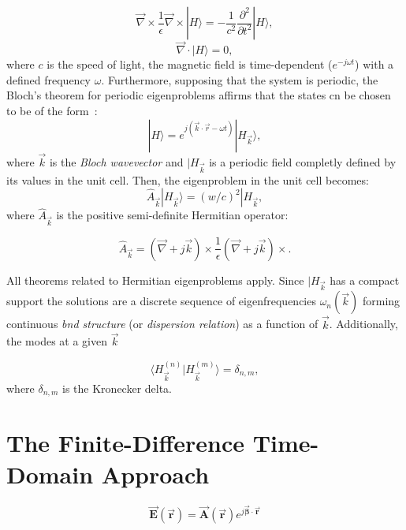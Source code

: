 \documentclass[journal,transmag]{IEEEtran}
\begin{document}
\begin{equation}
	\vec{\nabla} \times \frac{1}{\epsilon}\vec{\nabla}\times | H \rangle =
	-\frac{1}{c^{2}}\frac{\partial^{2}}{\partial t^{2}} |H \rangle,
\end{equation}
\begin{equation}
	\vec{\nabla}\cdot |H \rangle = 0,
\end{equation}
where $c$ is the speed of light, the magnetic field is time-dependent ($e^{-j\omega t}$)
with a defined frequency $\omega$.
Furthermore, supposing that the system is periodic, the Bloch's theorem
for periodic eigenproblems affirms that the states cn be chosen to be of the form~\cite{ashcroft_solid_1976}:
\begin{equation}
	|H \rangle = e^{j(\vec{k} \cdot \vec{r}-\omega t)} |H_{\vec{k}} \rangle,
\end{equation}
where $\vec{k}$ is the \textit{Bloch wavevector} and $|H_{\vec{k}}$ is a periodic field
completly defined by its values in the unit cell. Then, the eigenproblem in the unit cell becomes:
\begin{equation}
	\hat{A}_{\vec{k}}|H_{\vec{k}} \rangle = {(w/c)}^{2}|H_{\vec{k}},
\end{equation}
where $\hat{A}_{\vec{k}}$ is the positive semi-definite Hermitian operator:

\begin{equation}
	\hat{A}_{\vec{k}} = (\vec{\nabla}+j\vec{k})\times \frac{1}{\epsilon}
	(\vec{\nabla}+j\vec{k})\times.
\end{equation}

All theorems related to Hermitian eigenproblems apply. Since $|H_{\vec{k}}$
has a compact support the solutions are a discrete sequence of eigenfrequencies
$\omega_{n}(\vec{k})$ forming  continuous \textit{bnd structure} (or \textit{dispersion relation})
as a function of $\vec{k}$. Additionally, the modes at a given $\vec{k}$

\begin{equation}
	\langle H_{\vec{k}}^{(n)}|H_{\vec{k}}^{(m)} \rangle = \delta_{n,m},
\end{equation}
where $\delta_{n,m}$ is the Kronecker delta.
\section{The Finite-Difference Time-Domain Approach}

\begin{equation}
	\vec{\bm{E}}(\vec{\bm{r}}) = \vec{\bm{A}}(\vec{\bm{r}}) e^{j \vec{\bm{\beta}}\cdot \vec{\bm{r}}}
\end{equation}
\end{document}
